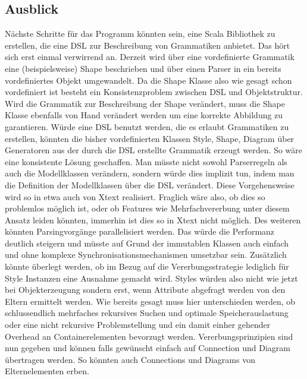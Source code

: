 \subsection{Ausblick}
Nächste Schritte für das Programm könnten sein, eine Scala Bibliothek zu erstellen, die eine DSL zur Beschreibung von Grammatiken anbietet. Das hört sich erst einmal verwirrend an. Derzeit wird über eine vordefinierte Grammatik eine (beispielsweise) Shape beschrieben und über einen Parser in ein bereits vordefiniertes Objekt umgewandelt. Da die Shape Klasse also wie gesagt schon vordefiniert ist besteht ein Konsistenzproblem zwischen DSL und Objektstruktur. Wird die Grammatik zur Beschreibung der Shape verändert, muss die Shape Klasse ebenfalls von Hand verändert werden um eine korrekte Abbildung zu garantieren. Würde eine DSL benutzt werden, die es erlaubt Grammatiken zu erstellen, könnten die bisher vordefinierten Klassen Style, Shape, Diagram über Generatoren aus der durch die DSL erstellte Grammatik erzeugt werden. So wäre eine konsistente Lösung geschaffen. Man müsste nicht sowohl Parserregeln als auch die Modellklassen verändern, sondern würde dies implizit tun, indem man die Definition der Modellklassen über die DSL verändert. Diese Vorgehensweise wird so in etwa auch von Xtext realisiert. Fraglich wäre also, ob dies so problemlos möglich ist, oder ob Features wie Mehrfachvererbung unter diesem Ansatz leiden könnten, immerhin ist dies so in Xtext nicht möglich. Des weiteren könnten Parsingvorgänge parallelisiert werden. Das würde die Performanz deutlich steigern und müsste auf Grund der immutablen Klassen auch einfach und ohne komplexe Synchronisationsmechanismen umsetzbar sein. Zusätzlich könnte überlegt werden, ob im Bezug auf die Vererbungsstrategie lediglich für Style Instanzen eine Ausnahme gemacht wird. Styles würden also nicht wie jetzt bei Objekterzeugung sondern erst, wenn Attribute abgefragt werden von den Eltern ermittelt werden. Wie bereits gesagt muss hier unterschieden werden, ob schlussendlich mehrfaches rekursives Suchen und optimale Speicherauslastung oder eine nicht rekursive Problemstellung und ein damit einher gehender Overhead an Containerelementen bevorzugt werden. Vererbungsprinzipien sind nun gegeben und können falls gewünscht einfach auf Connection und Diagram übertragen werden. So könnten auch Connections und Diagrams von Elternelementen erben. 
